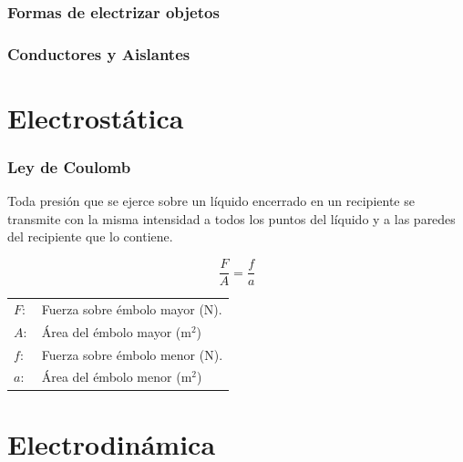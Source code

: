 \documentclass[handout]{beamer}
\begin{document}
\begin{frame}
  \frametitle{Formas de electrizar objetos}
  
\end{frame}

\begin{frame}
  \frametitle{Conductores y Aislantes}
  
\end{frame}

\section{Electrostática}


\begin{frame}
  \frametitle{Ley de Coulomb}
  \begin{block}{}
    Toda presión que se ejerce sobre un líquido encerrado en un recipiente se transmite
    con la misma intensidad a todos los puntos del líquido y a las paredes del recipiente
    que lo contiene.
  \end{block}
  
  {\huge \[\frac{F}{A} = \frac{f}{a}\]}
  
  \begin{tabular}{ll}
    $F:$ & Fuerza sobre émbolo mayor (N).  \\ 
    $A:$ & Área del émbolo mayor (m$^2$) \\ 
    $f:$ & Fuerza sobre émbolo menor (N). \\
    $a:$ & Área del émbolo menor (m$^2$) \\
  \end{tabular}
  
\end{frame}

\section{Electrodinámica}
\end{document}
